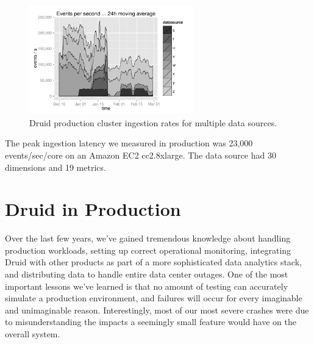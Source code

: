 \documentclass{acm_proc_article-sp}
\begin{document}
\begin{figure}
\centering
\includegraphics[width = 2.8in]{ingestion_rate}
\caption{Druid production cluster ingestion rates for multiple data sources.}
\label{fig:ingestion_rate}
\end{figure}

The peak ingestion latency we measured in production was 23,000 events/sec/core
on an Amazon EC2 cc2.8xlarge. The data source had 30 dimensions and 19 metrics.

\section{Druid in Production}
\label{sec:production}
Over the last few years, we've gained tremendous
knowledge about handling production workloads, setting up correct operational
monitoring, integrating Druid with other products as part of a more
sophisticated data analytics stack, and distributing data to handle entire data
center outages. One of the most important lessons we've learned is that no
amount of testing can accurately simulate a production environment, and failures
will occur for every imaginable and unimaginable reason. Interestingly, most of
our most severe crashes were due to misunderstanding the impacts a
seemingly small feature would have on the overall system. 
\end{document}
